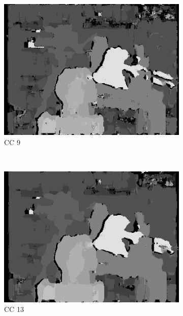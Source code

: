 \begin{figure}
  \begin{subfigure}[b]{0.23\textwidth}
    \centering
    \includegraphics[width=\textwidth]{images/stereo-pairs/tsukuba_dual_crosschecked_9.png}
    \caption{CC 9}
  \end{subfigure}
  ~
  \begin{subfigure}[b]{0.23\textwidth}
    \centering
    \includegraphics[width=\textwidth]{images/stereo-pairs/tsukuba_dual_crosschecked_13.png}
    \caption{CC 13}
  \end{subfigure}
  ~
  \begin{subfigure}[b]{0.23\textwidth}
    \centering

\end{subfigure}
\end{figure}
